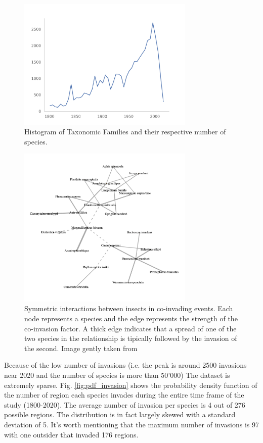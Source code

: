 \documentclass[mscthesis]{usiinfthesis}
\begin{document}
\begin{figure}[H]
    \centering
    \includegraphics[width=0.75\textwidth]{invasion_per_year.png}
    \caption{Histogram of Taxonomic Families and their respective number of species.}
    \label{fig:invasion_per_year}
\end{figure}


\begin{figure}[H]
    \centering
    \includegraphics[width=0.75\textwidth]{coinvasion.png}
    \caption{Symmetric interactions between insects in co-invading events. Each node represents a species and the edge represents the strength of the co-invasion factor. A thick edge indicates that a spread of one of the two species in the relationship is tipically followed by the invasion of the second. Image gently taken from \cite{intro:ecological}}
    \label{fig:hist_tax_fam}
\end{figure}

Because of the low number of invasions (i.e. the peak is around 2500 invasions near 2020 and the number of species is more than 50'000) The dataset is extremely sparse. Fig. \ref{fig:pdf_invasion} shows the probability density function of the number of region each species invades during the entire time frame of the study (1800-2020).  The average number of invasion per species is 4 out of 276 possible regions. The distribution is in fact largely skewed with a standard deviation of 5. It's worth mentioning that the maximum number of invasions is 97 with one outsider that invaded 176 regions.
\end{document}
